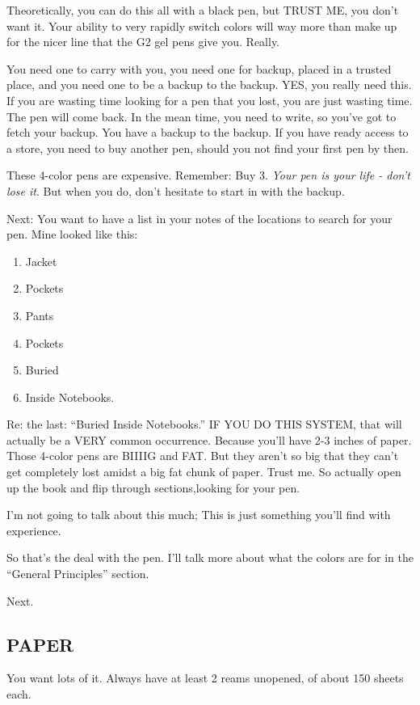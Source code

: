 \documentclass[oneside]{book}
\begin{document}
Theoretically, you can do this all with a black pen, but TRUST ME, you
don't want it. Your ability to very rapidly switch colors will way
more than make up for the nicer line that the G2 gel pens give
you. Really.

You need one to carry with you, you need one for backup, placed in a
trusted place, and you need one to be a backup to the backup. YES, you
really need this. If you are wasting time looking for a pen that you
lost, you are just wasting time. The pen will come back. In the mean
time, you need to write, so you've got to fetch your backup. You have
a backup to the backup. If you have ready access to a store, you need
to buy another pen, should you not find your first pen by then.

These 4-color pens are expensive. Remember: Buy 3. \emph{Your pen is your 
life - don't lose it}.  But when you do, don't hesitate to start in with
the backup.

Next: You want to have a list in your notes of the locations to search
for your pen. Mine looked like this:

\begin{enumerate}
\item Jacket 
\item Pockets 
\item Pants 
\item Pockets 
\item Buried 
\item Inside Notebooks.
\end{enumerate}

Re: the last: ``Buried Inside Notebooks.'' IF YOU DO THIS SYSTEM, that
will actually be a VERY common occurrence. Because you'll have 2-3
inches of paper. Those 4-color pens are BIIIIG and FAT. But they
aren't so big that they can't get completely lost amidst a big fat
chunk of paper. Trust me. So actually open up the book and flip
through sections,looking for your pen.

I'm not going to talk about this much; This is just something you'll
find with experience.

So that's the deal with the pen. I'll talk more about what the colors
are for in the ``General Principles'' section.

Next.

\subsection*{PAPER}

You want lots of it. Always have at least 2 reams unopened, of about
150 sheets each.
\end{document}
